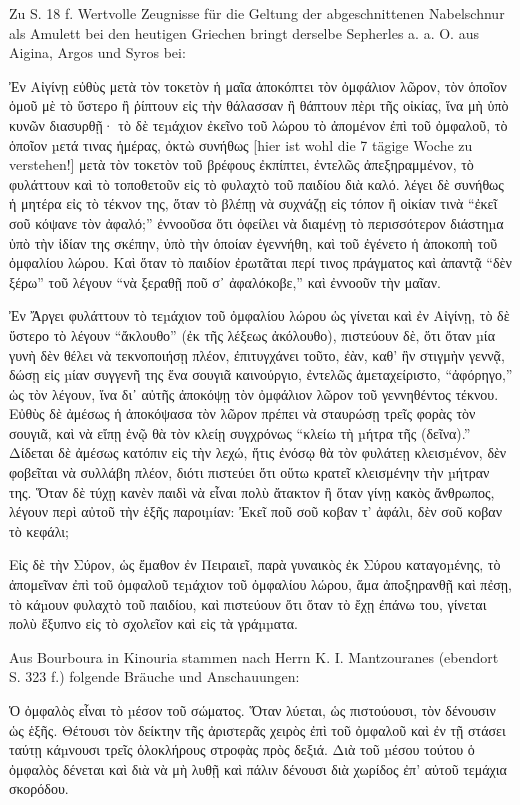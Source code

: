 \documentclass[a4paper, 11pt, oneside]{article}
\begin{document}
Zu S. 18 f. Wertvolle Zeugnisse für die Geltung der abgeschnittenen Nabelschnur als Amulett bei den heutigen Griechen bringt derselbe Sepherles a. a. O. aus Aigina, Argos und Syros bei:

Ἐν Αἰγίνῃ εὐθὺς μετὰ τὸν τοκετὸν ἡ μαῖα ἁποκόπτει τὸν ὀμφάλιον λῶρον, τὸν ὁποῖον ὁμοῦ μὲ τὸ ὕστερο ἢ ῥίπτουν εἰς τὴν θάλασσαν ἢ θάπτουν πὲρι τῆς οἰκίας, ἵνα μὴ ὑπὸ κυνῶν διασυρθῇ· τὸ δὲ τεµάχιον ἐκεῖνο τοῦ λώρου τὸ ἀπομένον ἐπὶ τοῦ ὀμφαλοῦ, τὸ ὁποῖον µετά τινας ἡμέρας, ὀκτὼ συνήθως [hier ist wohl die 7 tägige Woche zu verstehen!] μετὰ τὸν τοκετὸν τοῦ βρέφους ἐκπίπτει, ἐντελῶς ἀπεξηραμμένον, τὸ φυλάττουν καὶ τὸ τοποθετοῦν εἰς τὸ φυλαχτὸ τοῦ παιδίου διὰ καλό. λέγει δὲ συνήθως ἡ μητέρα εἰς τὸ τέκνον της, ὅταν τὸ βλέπῃ νὰ συχνάζῃ εἰς τόπον ἢ οἰκίαν τινὰ "`ἐκεῖ σοῦ κόψανε τὸν ἀφαλό;"' ἐννοοῦσα ὅτι ὀφείλει νὰ διαμένῃ τὸ περισσότερον διάστηµα ὑπὸ τὴν ἰδίαν της σκέπην, ὑπὸ τὴν ὁποίαν ἐγεννήθη, καὶ τοῦ ἐγένετο ἡ ἀποκοπὴ τοῦ ὀμφαλίου λώρου. Καὶ ὅταν τὸ παιδίον ἐρωτᾶται περί τινος πράγματος καὶ ἀπαντᾷ "`δὲν ξέρω"' τοῦ λέγουν "`νὰ ξεραθῇ ποῦ σ᾿ ἀφαλόκοβε,"' καὶ ἐννοοῦν τὴν μαῖαν.

Ἐν Ἄργει φυλάττουν τὸ τεµάχιον τοῦ ὀμφαλίου λώρου ὡς γίνεται καὶ ἐν Αἰγίνῃ, τὸ δὲ ὕστερο τὸ λέγουν "`ἄκλουθο"' (ἐκ τῆς λέξεως ἀκόλουθο), πιστεύουν δὲ, ὅτι ὅταν µία γυνὴ δὲν θέλει νὰ τεκνοποιήσῃ πλέον, ἐπιτυγχάνει τοῦτο, ἐὰν, καθ' ἣν στιγμὴν γεννᾷ, δώσῃ εἰς µίαν συγγενῆ της ἕνα σουγιᾶ καινούργιο, ἐντελῶς ἁμεταχείριστο, "`ἀφόρηγο,"' ὡς τὸν λέγουν, ἵνα δι᾿ αὐτῆς ἀποκόψῃ τὸν ὀμφάλιον λῶρον τοῦ γεννηθέντος τέκνου. Εὐθὺς δὲ ἀμέσως ἡ ἀποκόψασα τὸν λῶρον πρέπει νὰ σταυρώσῃ τρεῖς φορὰς τὸν σουγιᾶ, καὶ νὰ εἴπῃ ἑνῷ θὰ τὸν κλείῃ συγχρόνως "`κλείω τὴ µήτρα τῆς (δεῖνα)."' Δίδεται δὲ ἀμέσως κατόπιν εἰς τὴν λεχώ, ἥτις ἐνόσῳ θὰ τὸν φυλάτεῃ κλεισµένον, δὲν φοβεῖται νὰ συλλάβη πλέον, διότι πιστεύει ὅτι οὕτω κρατεῖ κλεισμένην τὴν µήτραν της. Ὅταν δὲ τύχῃ κανὲν παιδὶ νὰ εἶναι πολὺ ἄτακτον ἢ ὅταν γίνῃ κακὸς ἄνθρωπος, λέγουν περὶ αὐτοῦ τὴν ἑξῆς παροιµίαν: Ἐκεῖ ποῦ σοῦ κοβαν τ' ἀφάλι, δὲν σοῦ κοβαν τὸ κεφάλι;

Εἰς δὲ τὴν Σύρον, ὡς ἔμαθον ἐν Πειραιεῖ, παρὰ γυναικὸς ἐκ Σύρου καταγοµένης, τὸ ἀπομεῖναν ἐπὶ τοῦ ὀμφαλοῦ τεµάχιον τοῦ ὀμφαλίου λώρου, ἅμα ἀποξηρανθῇ καὶ πἐσῃ, τὸ κάµουν φυλαχτὸ τοῦ παιδίου, καὶ πιστεύουν ὅτι ὅταν τὸ ἔχῃ ἐπάνω του, γίνεται πολὺ ἔξυπνο εἰς τὸ σχολεῖον καὶ εἰς τὰ γράµµατα.

Aus Bourboura in Kinouria stammen nach Herrn K. I. Mantzouranes (ebendort S. 323 f.) folgende Bräuche und Anschauungen:

Ὁ ὀμφαλὸς εἶναι τὸ µέσον τοῦ σώματος. Ὅταν λύεται, ὡς πιστούουσι, τὸν δένουσιν ὡς ἑξῆς. Θέτουσι τὸν δείκτην τῆς ἀριστερᾶς χειρὸς ἐπὶ τοῦ ὀμφαλοῦ καὶ ἐν τῇ στάσει ταύτῃ κάµνουσι τρεῖς ὁλοκλήρους στροφὰς πρὸς δεξιά. Διὰ τοῦ µέσου τούτου ὁ ὀμφαλὸς δένεται καὶ διὰ νὰ μὴ λυθῇ καὶ πάλιν δένουσι διὰ χωρίδος ἐπ' αὐτοῦ τεμάχια σκορόδου.
\end{document}
